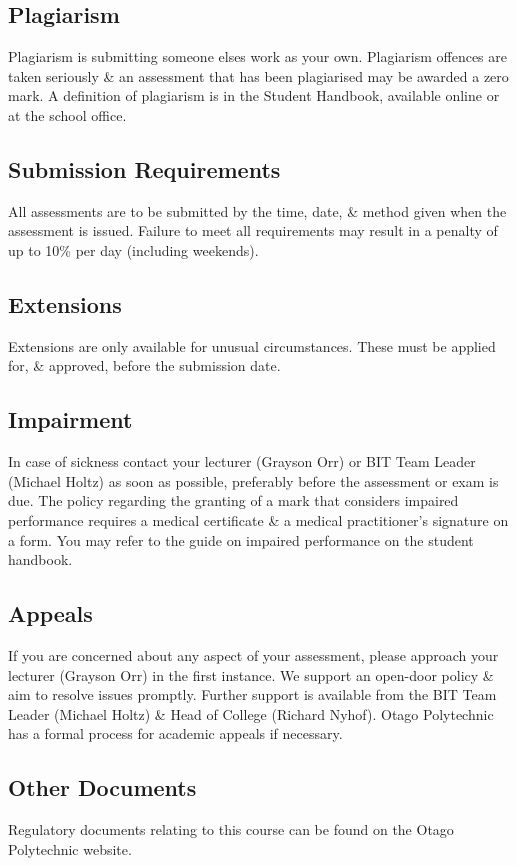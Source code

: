 \documentclass{article}
\begin{document}
\subsection*{Plagiarism}
Plagiarism is submitting someone elses work as your own. Plagiarism offences are taken seriously \& an assessment that has been plagiarised may be awarded a zero mark. A definition of plagiarism is in the Student Handbook, available online or at the school office.

\subsection*{Submission Requirements}
All assessments are to be submitted by the time, date, \& method given when the assessment is issued. Failure to meet all requirements may result in a penalty of up to 10\% per day (including weekends).

\subsection*{Extensions}
Extensions are only available for unusual circumstances. These must be applied for, \& approved, before the submission date.

\subsection*{Impairment}
In case of sickness contact your lecturer (Grayson Orr) or BIT Team Leader (Michael Holtz) as soon as possible, preferably before the assessment or exam is due. The policy regarding the granting of a mark that considers impaired performance requires a medical certificate \& a medical practitioner’s signature on a form. You may refer to the guide on impaired performance on the student handbook.

\subsection*{Appeals}
If you are concerned about any aspect of your assessment, please approach your lecturer (Grayson Orr) in the first instance. We support an open-door policy \& aim to resolve issues promptly. Further support is available from the BIT Team Leader (Michael Holtz) \& Head of College (Richard Nyhof). Otago Polytechnic has a formal process for academic appeals if necessary.

\subsection*{Other Documents}
Regulatory documents relating to this course can be found on the Otago Polytechnic website.
\end{document}
